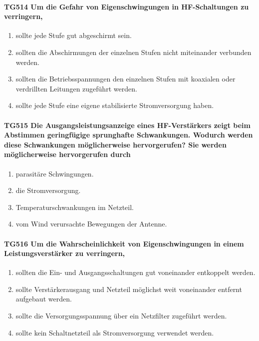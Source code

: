 \documentclass[8pt]{article}
\begin{document}
\paragraph*{TG514 Um die Gefahr von Eigenschwingungen in HF-Schaltungen zu verringern,} 
\begin{enumerate}[nolistsep,label=\Alph*]
\item sollte jede Stufe gut abgeschirmt sein.
\item sollten die Abschirmungen der einzelnen Stufen nicht miteinander verbunden werden.
\item sollten die Betriebsspannungen den einzelnen Stufen mit koaxialen oder verdrillten Leitungen zugeführt werden.
\item sollte jede Stufe eine eigene stabilisierte Stromversorgung haben.
\end{enumerate}

\paragraph*{TG515 Die Ausgangsleistungsanzeige eines HF-Verstärkers zeigt beim Abstimmen geringfügige sprunghafte Schwankungen. Wodurch werden diese Schwankungen möglicherweise hervorgerufen? Sie werden möglicherweise hervorgerufen durch}
\begin{enumerate}[nolistsep,label=\Alph*]
\item parasitäre Schwingungen.
\item die Stromversorgung.
\item Temperaturschwankungen im Netzteil.
\item vom Wind verursachte Bewegungen der Antenne.
\end{enumerate}

\paragraph*{TG516 Um die Wahrscheinlichkeit von Eigenschwingungen in einem Leistungsverstärker zu verringern,}
\begin{enumerate}[nolistsep,label=\Alph*]
\item sollten die Ein- und Ausgangsschaltungen gut voneinander entkoppelt werden.
\item sollte Verstärkerausgang und Netzteil möglichst weit voneinander entfernt aufgebaut werden.
\item sollte die Versorgungsspannung über ein Netzfilter zugeführt werden.
\item sollte kein Schaltnetzteil als Stromversorgung verwendet werden.
\end{enumerate}
\end{document}

